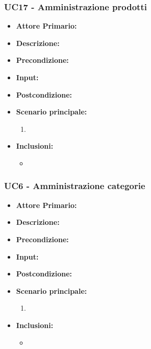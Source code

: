 \subsubsection{UC17 - Amministrazione prodotti}
\begin{itemize}
    \item \textbf{Attore Primario:} 
    \item \textbf{Descrizione:}
    \item \textbf{Precondizione:}
    \item \textbf{Input:}
    \item \textbf{Postcondizione:}
    \item \textbf{Scenario principale:}
    \begin{enumerate}
        \item 
    \end{enumerate}
    \item \textbf{Inclusioni:}
    \begin{itemize}
        \item
    \end{itemize}
\end{itemize}
\subsubsection{UC6 - Amministrazione categorie}
\begin{itemize}
    \item \textbf{Attore Primario:} 
    \item \textbf{Descrizione:}
    \item \textbf{Precondizione:}
    \item \textbf{Input:}
    \item \textbf{Postcondizione:}
    \item \textbf{Scenario principale:}
    \begin{enumerate}
        \item 
    \end{enumerate}
    \item \textbf{Inclusioni:}
    \begin{itemize}
        \item
    \end{itemize}
\end{itemize}
